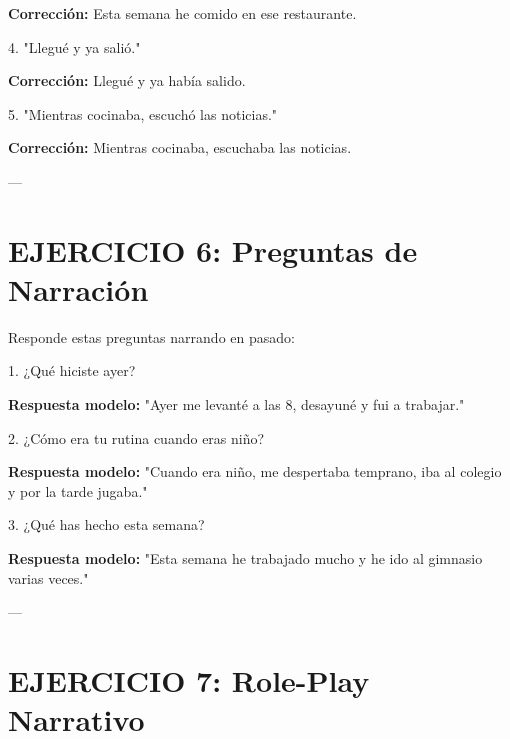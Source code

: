 \documentclass[a4paper,11pt]{article}
\begin{document}
\textbf{Corrección:} Esta semana he comido en ese restaurante.

\vspace{0.2cm}

4. "Llegué y ya salió."

\textbf{Corrección:} Llegué y ya había salido.

\vspace{0.2cm}

5. "Mientras cocinaba, escuchó las noticias."

\textbf{Corrección:} Mientras cocinaba, escuchaba las noticias.

\vspace{0.2cm}

---

\vspace{0.2cm}

\section{EJERCICIO 6: Preguntas de Narración}

\vspace{0.2cm}

Responde estas preguntas narrando en pasado:

\vspace{0.2cm}

1. ¿Qué hiciste ayer?

\textbf{Respuesta modelo:} "Ayer me levanté a las 8, desayuné y fui a trabajar."

\vspace{0.2cm}

2. ¿Cómo era tu rutina cuando eras niño?

\textbf{Respuesta modelo:} "Cuando era niño, me despertaba temprano, iba al colegio y por la tarde jugaba."

\vspace{0.2cm}

3. ¿Qué has hecho esta semana?

\textbf{Respuesta modelo:} "Esta semana he trabajado mucho y he ido al gimnasio varias veces."

\vspace{0.2cm}

---

\vspace{0.2cm}

\section{EJERCICIO 7: Role-Play Narrativo}
\end{document}
